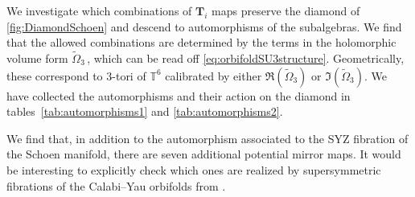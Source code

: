 \documentclass{pspum-l}
\theoremstyle{definition}
\theoremstyle{remark}
\numberwithin{equation}{section}
\begin{document}
We investigate which combinations of $\textbf{T}_i$ maps preserve the diamond of \cref{fig:DiamondSchoen} and descend to automorphisms of the subalgebras. We find that the allowed combinations are determined by the terms in the holomorphic volume form $\widetilde{\Omega}_3\,$, which can be read off \eqref{eq:orbifoldSU3structure}. Geometrically, these correspond to 3-tori of $\mathbb{T}^6$ calibrated by either $\Re(\widetilde{\Omega}_3)$ or $\Im(\widetilde{\Omega}_3)$. We have collected the automorphisms and their action on the diamond in tables~\ref{tab:automorphisms1} and \ref{tab:automorphisms2}.

We find that, in addition to the automorphism associated to the SYZ fibration of the Schoen manifold, there are seven additional potential mirror maps. It would be interesting to explicitly check which ones are realized by supersymmetric fibrations of the Calabi--Yau orbifolds from \cite{Donagi:2008xy}.
\end{document}
